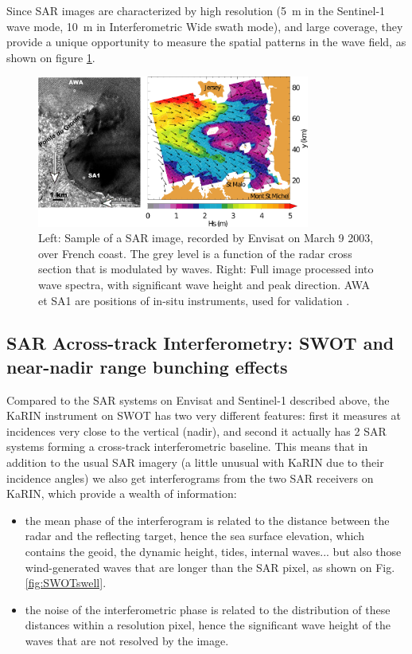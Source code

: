 Since SAR images are characterized by high resolution (5~m in the Sentinel-1 wave mode, 10~m in Interferometric Wide swath mode), and large coverage, they provide a unique opportunity 
to measure the spatial patterns in the wave field, as shown on figure \ref{SAR_exemple}.

\begin{figure}[!h]
\centerline{\includegraphics[width=0.8\textwidth]{FIGS_CH_SAT/Image_SAR_Cancale2.png}}
\caption{Left: Sample of a SAR image, recorded by Envisat  on March 9 2003, over French coast. The grey level is a function of the radar cross section that is modulated by waves. 
Right: Full image processed into wave spectra, with significant wave height and peak direction. AWA et SA1 are positions of in-situ instruments, 
used for validation \citep{Collard&al.2005}.}
\label{SAR_exemple}
\end{figure}



\subsection{SAR Across-track Interferometry: SWOT and near-nadir range bunching effects}
Compared to the SAR systems on Envisat and Sentinel-1 described above, the KaRIN instrument on SWOT has two very different features: first it measures at incidences very close to the vertical (nadir), and second it actually has 2 SAR systems forming a cross-track interferometric baseline. This means that in addition to the usual SAR imagery (a little unusual with KaRIN due to their incidence angles) we also get interferograms from the two SAR receivers on KaRIN, which provide a wealth of information: 
\begin{itemize}
\item the mean phase of the interferogram is related to the distance between the radar and the reflecting target, hence the sea surface elevation, which contains the geoid, the dynamic height, tides, internal waves... but also those wind-generated waves that are longer than the SAR pixel, as shown on Fig. \ref{fig:SWOTswell}. 
\item the noise of the interferometric phase is related to the distribution of these distances within a resolution pixel, hence the significant wave height of the waves that are not resolved by the image. 
\end{itemize}

